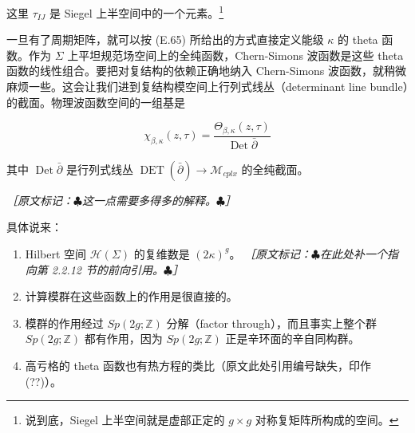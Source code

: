 
这里 $\tau_{IJ}$ 是 Siegel 上半空间中的一个元素。\footnote{说到底，Siegel 上半空间就是虚部正定的 $g\times g$ 对称复矩阵所构成的空间。}

一旦有了周期矩阵，就可以按 (E.65) 所给出的方式直接定义能级 $\kappa$ 的 theta 函数。作为 $\Sigma$ 上平坦规范场空间上的全纯函数，Chern-Simons 波函数是这些 theta 函数的线性组合。要把对复结构的依赖正确地纳入 Chern-Simons 波函数，就稍微麻烦一些。这会让我们进到复结构模空间上行列式线丛（determinant line bundle）的截面。物理波函数空间的一组基是

\begin{equation}
  \chi_{\beta,\kappa}(z,\tau)=\frac{\Theta_{\beta,\kappa}(z,\tau)}{\operatorname{Det}\bar\partial}
  \tag{2.181}
  \label{eq:2.181}
\end{equation}

其中 $\operatorname{Det}\bar\partial$ 是行列式线丛 $\operatorname{DET}(\bar\partial)\to\mathcal{M}_{cplx}$ 的全纯截面。

{\small\itshape ［原文标记：$\clubsuit$这一点需要多得多的解释。$\clubsuit$］}

具体说来：

\begin{enumerate}
  \item Hilbert 空间 $\mathcal{H}(\Sigma)$ 的复维数是 $(2\kappa)^g$。
  {\small\itshape ［原文标记：$\clubsuit$在此处补一个指向第 2.2.12 节的前向引用。$\clubsuit$］}
  \item 计算模群在这些函数上的作用是很直接的。
  \item 模群的作用经过 $Sp(2g;\mathbb{Z})$ 分解（factor through），而且事实上整个群 $Sp(2g;\mathbb{Z})$ 都有作用，因为 $Sp(2g;\mathbb{Z})$ 正是辛环面的辛自同构群。
  \item 高亏格的 theta 函数也有热方程的类比（原文此处引用编号缺失，印作 (??)）。
\end{enumerate}

